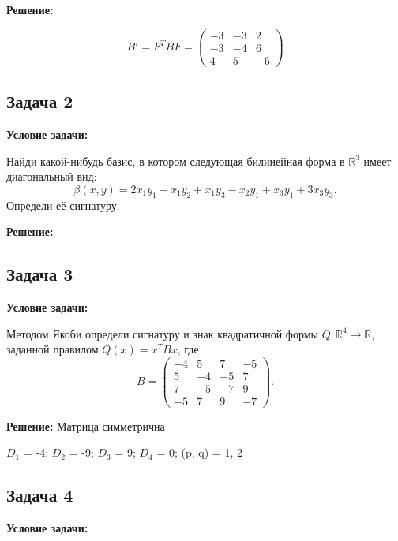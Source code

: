 \documentclass[a4paper,12pt]{article}
\begin{document}
\textbf{Решение:}

\[
B' =  F^TBF = \begin{pmatrix}
    -3 & -3 & 2 \\
    -3 & -4 & 6 \\
    4 & 5 & -6 
\end{pmatrix}
\]

\vspace{1cm}

\subsection{Задача 2}
\textbf{Условие задачи:}

Найди какой-нибудь базис, в котором следующая билинейная форма в $\mathbb{R}^3$ имеет диагональный вид:
$$
\beta(x, y) = 2x_1y_1 - x_1y_2 + x_1y_3 - x_2y_1 + x_3y_1 + 3x_3y_3.
$$
Определи её сигнатуру.

\textbf{Решение:}

\vspace{1cm}

\subsection{Задача 3}
\textbf{Условие задачи:}

Методом Якоби определи сигнатуру и знак квадратичной формы $Q: \mathbb{R}^4 \to \mathbb{R}$, заданной правилом $Q(x) = x^T B x$, где
$$
B =
\begin{pmatrix}
-4 & 5 & 7 & -5 \\
5 & -4 & -5 & 7 \\
7 & -5 & -7 & 9 \\
-5 & 7 & 9 & -7
\end{pmatrix}.
$$

\textbf{Решение:}
Матрица симметрична

$D_1$ = -4; $D_2$ = -9; $D_3$ = 9; $D_4$ = 0; (p, q) = 1, 2

\vspace{1cm}

\subsection{Задача 4}
\textbf{Условие задачи:}
\end{document}
